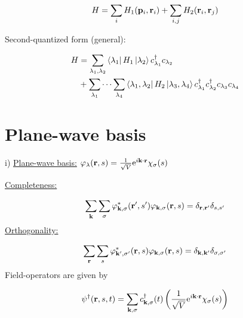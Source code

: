 \begin{equation}
	H= \sum_i H_1(\vb{p}_i, \vb{r}_i) + \sum_{i,j} H_2 (\vb{r}_i, \vb{r}_j )
\end{equation}

\begin{tcolorbox}
	\noindent Second-quantized form (general):
	
	\begin{align}
		H & = \sum_{\lambda_{1}, \lambda_{2}} \bra{\lambda_{1}} H_1 \ket{\lambda_{2}} c^{\dagger}_{\lambda_1} c_{\lambda_2} \nonumber \\
		&+ \sum_{\lambda_{1}} \cdots \sum_{\lambda_{4}} \bra{\lambda_{1}, \lambda_{2}} H_2 \ket{\lambda_{3}, \lambda_{4}} c^{\dagger}_{\lambda_1} c^{\dagger}_{\lambda_2} c_{\lambda_{3}} c_{\lambda_{4}}
	\end{align}
\end{tcolorbox}

\section{Plane-wave basis}

\noindent i) \uline{Plane-wave basis:}  ${\varphi_{\lambda} (\vb{r},s) = \frac{1}{\sqrt{V}} \mathrm{e}^{i \vb{k}\cdot \vb{r}} \chi_\sigma (s)  }$ \\
\linebreak

\noindent \uline{Completeness:}

\begin{equation}
	\sum_{\vb{k}} \sum_{\sigma} \varphi_{\vb{k}, \sigma}^* (\vb{r}', s') \varphi_{\vb{k}, \sigma} (\vb{r}, s) = \delta_{\vb{r}, \vb{r}'} \delta_{s,s'}
\end{equation}
\linebreak
\noindent \uline{Orthogonality:}

\begin{equation}
	\sum_{\vb{r}} \sum_{s} \varphi_{\vb{k}', \sigma'}^* (\vb{r}, s) \varphi_{\vb{k}, \sigma} (\vb{r}, s) = \delta_{\vb{k}, \vb{k}'} \delta_{\sigma,\sigma'}
\end{equation}
\linebreak
\noindent Field-operators are given by

\begin{equation}
	\psi^\dagger (\vb{r},s,t) = \sum_{\vb{k}, \sigma} c^{\dagger}_{\vb{k}, \sigma} (t) \left( \frac{1}{\sqrt{V}} \mathrm{e}^{i \vb{k} \cdot \vb{r}} \chi_\sigma (s) \right)
\end{equation}

